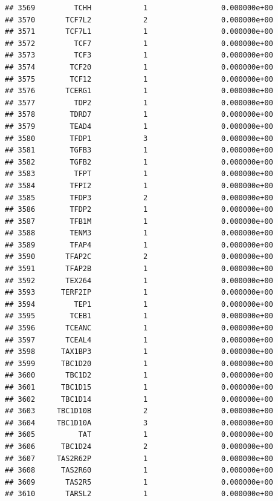 \documentclass[
]{article}
\begin{document}
\begin{verbatim}
## 3569         TCHH            1                 0.000000e+00
## 3570       TCF7L2            2                 0.000000e+00
## 3571       TCF7L1            1                 0.000000e+00
## 3572         TCF7            1                 0.000000e+00
## 3573         TCF3            1                 0.000000e+00
## 3574        TCF20            1                 0.000000e+00
## 3575        TCF12            1                 0.000000e+00
## 3576       TCERG1            1                 0.000000e+00
## 3577         TDP2            1                 0.000000e+00
## 3578        TDRD7            1                 0.000000e+00
## 3579        TEAD4            1                 0.000000e+00
## 3580        TFDP1            3                 0.000000e+00
## 3581        TGFB3            1                 0.000000e+00
## 3582        TGFB2            1                 0.000000e+00
## 3583         TFPT            1                 0.000000e+00
## 3584        TFPI2            1                 0.000000e+00
## 3585        TFDP3            2                 0.000000e+00
## 3586        TFDP2            1                 0.000000e+00
## 3587        TFB1M            1                 0.000000e+00
## 3588        TENM3            1                 0.000000e+00
## 3589        TFAP4            1                 0.000000e+00
## 3590       TFAP2C            2                 0.000000e+00
## 3591       TFAP2B            1                 0.000000e+00
## 3592       TEX264            1                 0.000000e+00
## 3593      TERF2IP            1                 0.000000e+00
## 3594         TEP1            1                 0.000000e+00
## 3595        TCEB1            1                 0.000000e+00
## 3596       TCEANC            1                 0.000000e+00
## 3597       TCEAL4            1                 0.000000e+00
## 3598      TAX1BP3            1                 0.000000e+00
## 3599      TBC1D20            1                 0.000000e+00
## 3600       TBC1D2            1                 0.000000e+00
## 3601      TBC1D15            1                 0.000000e+00
## 3602      TBC1D14            1                 0.000000e+00
## 3603     TBC1D10B            2                 0.000000e+00
## 3604     TBC1D10A            3                 0.000000e+00
## 3605          TAT            1                 0.000000e+00
## 3606      TBC1D24            2                 0.000000e+00
## 3607     TAS2R62P            1                 0.000000e+00
## 3608      TAS2R60            1                 0.000000e+00
## 3609       TAS2R5            1                 0.000000e+00
## 3610       TARSL2            1                 0.000000e+00

\end{verbatim}
\end{document}
